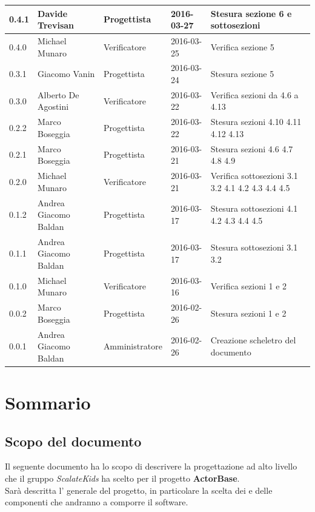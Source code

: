 \documentclass{scalatekids-article}
\begin{document}
\begin{center}
\begin{longtable}{| l | l | l | l | p{5cm} |}
    \hline
    0.4.1 & Davide Trevisan & Progettista & 2016-03-27 & Stesura sezione 6 e sottosezioni\\
    \hline
    0.4.0 & Michael Munaro & Verificatore & 2016-03-25 & Verifica sezione 5\\
    \hline
    0.3.1 & Giacomo Vanin & Progettista & 2016-03-24 & Stesura sezione 5\\
    \hline
    0.3.0 & Alberto De Agostini & Verificatore & 2016-03-22 & Verifica sezioni da 4.6 a 4.13\\
    \hline
    0.2.2 & Marco Boseggia & Progettista & 2016-03-22 & Stesura sezioni 4.10 4.11 4.12 4.13\\
    \hline
    0.2.1 & Marco Boseggia & Progettista & 2016-03-21 & Stesura sezioni 4.6 4.7 4.8 4.9\\
    \hline
    0.2.0 & Michael Munaro & Verificatore & 2016-03-21 & Verifica sottosezioni 3.1 3.2 4.1 4.2 4.3 4.4 4.5\\
    \hline
    0.1.2 & Andrea Giacomo Baldan & Progettista & 2016-03-17 & Stesura sottosezioni 4.1 4.2 4.3 4.4 4.5\\
    \hline
    0.1.1 & Andrea Giacomo Baldan & Progettista & 2016-03-17 & Stesura sottosezioni 3.1 3.2\\
    \hline
    0.1.0 & Michael Munaro & Verificatore & 2016-03-16 & Verifica sezioni 1 e 2\\
    \hline
    0.0.2 & Marco Boseggia & Progettista & 2016-02-26 & Stesura sezioni 1 e 2\\
    \hline
    0.0.1 & Andrea Giacomo Baldan & Amministratore & 2016-02-26 & Creazione scheletro del documento\\
    \hline
  \end{longtable}
\end{center}
\newpage
\tableofcontents
\newpage
{}

\section{Sommario}

\subsection{Scopo del documento}

Il seguente documento ha lo scopo di descrivere la progettazione ad alto livello
che il gruppo \textit{ScalateKids} ha scelto per il
progetto \textbf{ActorBase}.\\  Sarà descritta l' generale
del progetto, in particolare  la scelta dei  e delle
componenti che andranno a comporre il software.
\end{document}
